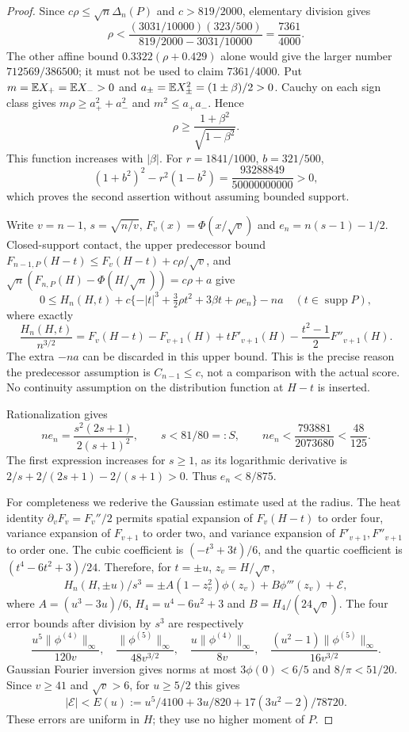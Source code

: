 \begin{proof}
Since $c\rho\le\sqrt n\Delta_n(P)$ and $c>819/2000$, elementary division gives
\[
 \rho<\frac{(3031/10000)(323/500)}{819/2000-3031/10000}
       =\frac{7361}{4000}.
\]
The other affine bound $0.3322(\rho+0.429)$ alone would give the larger
number $712569/386500$; it must not be used to claim $7361/4000$.
Put $m=\mathbb E X_+=\mathbb E X_->0$ and $a_\pm=\mathbb E X_\pm^2=(1\pm\beta)/2>0$.
Cauchy on each sign class gives $m\rho\ge a_+^2+a_-^2$ and
$m^2\le a_+a_-$. Hence
\[
 \rho\ge\frac{1+\beta^2}{\sqrt{1-\beta^2}}.
\]
This function increases with $|\beta|$. For $r=1841/1000$, $b=321/500$,
\[
 (1+b^2)^2-r^2(1-b^2)=\frac{93288849}{50000000000}>0,
\]
which proves the second assertion without assuming bounded support.

Write $v=n-1$, $s=\sqrt{n/v}$, $F_v(x)=\Phi(x/\sqrt v)$ and
$e_n=n(s-1)-1/2$. Closed-support contact, the upper predecessor
bound $F_{n-1,P}(H-t)\le F_v(H-t)+c\rho/\sqrt v$, and
$\sqrt n(F_{n,P}(H)-\Phi(H/\sqrt n))=c\rho+a$ give
\begin{equation}\label{v5entry:contact}
 0\le H_n(H,t)+c\{-|t|^3+\tfrac32\rho t^2+3\beta t+\rho e_n\}-na
 \quad(t\in\operatorname{supp}P),
\end{equation}
where exactly
\[
 \frac{H_n(H,t)}{n^{3/2}}
 =F_v(H-t)-F_{v+1}(H)+tF'_{v+1}(H)
                   -\frac{t^2-1}{2}F''_{v+1}(H).
\]
The extra $-na$ can be discarded in this upper bound. This is the precise
reason the predecessor assumption is $C_{n-1}\le c$, not a comparison
with the actual score. No continuity assumption on the distribution
function at $H-t$ is inserted.

Rationalization gives
\[
 ne_n=\frac{s^2(2s+1)}{2(s+1)^2},\qquad
 s<81/80=:S,\qquad
 ne_n<\frac{793881}{2073680}<\frac{48}{125}.
\]
The first expression increases for $s\ge1$, as its logarithmic derivative
is $2/s+2/(2s+1)-2/(s+1)>0$. Thus $e_n<8/875$.

For completeness we rederive the Gaussian estimate used at the radius.
The heat identity $\partial_vF_v=F_v''/2$ permits spatial expansion of
$F_v(H-t)$ to order four, variance expansion of $F_{v+1}$ to order two,
and variance expansion of $F'_{v+1},F''_{v+1}$ to order one. The cubic
coefficient is $(-t^3+3t)/6$, and the quartic coefficient is
$(t^4-6t^2+3)/24$. Therefore, for $t=\pm u$, $z_v=H/\sqrt v$,
\begin{equation}\label{v5entry:heat}
 H_n(H,\pm u)/s^3
 =\pm A(1-z_v^2)\phi(z_v)+B\phi'''(z_v)+\mathcal E,
\end{equation}
where $A=(u^3-3u)/6$, $H_4=u^4-6u^2+3$ and $B=H_4/(24\sqrt v)$.
The four error bounds after division by $s^3$ are respectively
\[
 \frac{u^5\|\phi^{(4)}\|_\infty}{120v},\quad
 \frac{\|\phi^{(5)}\|_\infty}{48v^{3/2}},\quad
 \frac{u\|\phi^{(4)}\|_\infty}{8v},\quad
 \frac{(u^2-1)\|\phi^{(5)}\|_\infty}{16v^{3/2}}.
\]
Gaussian Fourier inversion gives norms at most $3\phi(0)<6/5$ and
$8/\pi<51/20$. Since $v\ge41$ and $\sqrt v>6$, for $u\ge5/2$ this gives
\[
 |\mathcal E|<E(u):=u^5/4100+3u/820+17(3u^2-2)/78720.
\]
These errors are uniform in $H$; they use no higher moment of $P$.


\end{proof}
